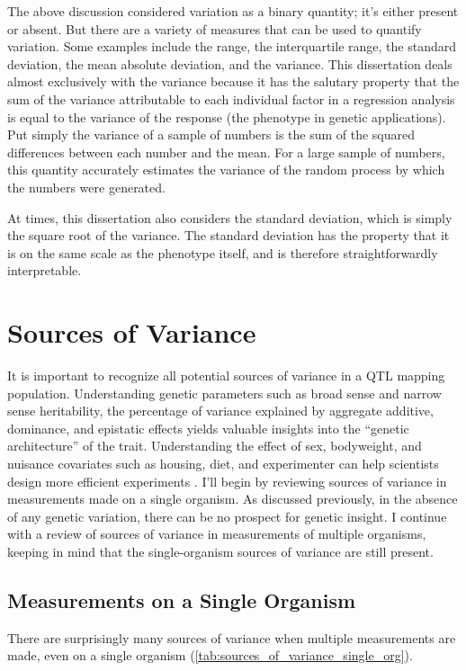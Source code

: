 The above discussion considered variation as a binary quantity; it's either present or absent.
But there are a variety of measures that can be used to quantify variation.
Some examples include the range, the interquartile range, the standard deviation, the mean absolute deviation, and the variance.
This dissertation deals almost exclusively with the variance because it has the salutary property that the sum of the variance attributable to each individual factor in a regression analysis is equal to the variance of the response (the phenotype in genetic applications).
Put simply the variance of a sample of numbers is the sum of the squared differences between each number and the mean.
For a large sample of numbers, this quantity accurately estimates the variance of the random process by which the numbers were generated.

At times, this dissertation also considers the standard deviation, which is simply the square root of the variance.
The standard deviation has the property that it is on the same scale as the phenotype itself, and is therefore straightforwardly interpretable.

\section{Sources of Variance}

It is important to recognize all potential sources of variance in a QTL mapping population.
Understanding genetic parameters such as broad sense and narrow sense heritability, the percentage of variance explained by aggregate additive, dominance, and epistatic effects yields valuable insights into the ``genetic architecture'' of the trait.
Understanding the effect of sex, bodyweight, and nuisance covariates such as housing, diet, and experimenter can help scientists design more efficient experiments \citep{Nettleton2006,Datta2014}.
I'll begin by reviewing sources of variance in measurements made on a single organism.
As discussed previously, in the absence of any genetic variation, there can be no prospect for genetic insight.
I continue with a review of sources of variance in measurements of multiple organisms, keeping in mind that the single-organism sources of variance are still present.


\subsection{Measurements on a Single Organism}

There are surprisingly many sources of variance when multiple measurements are made, even on a single organism (\autoref{tab:sources_of_variance_single_org}).

